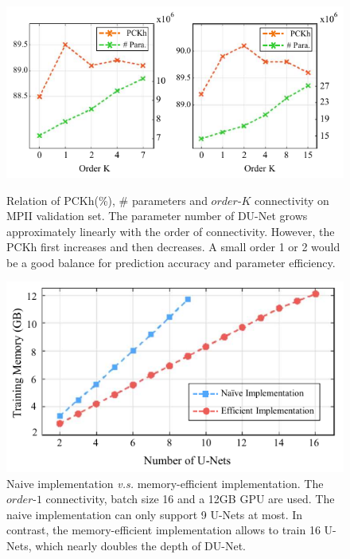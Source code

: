 \begin{figure}[t]
\centering
  \includegraphics[width=1\linewidth]{figures/exp-order-k-cropped.pdf}
  \caption{Relation of PCKh(\%), \# parameters and $order$-$K$ connectivity on MPII validation set. The parameter number of DU-Net grows approximately linearly with the order of connectivity. However, the PCKh first increases and then decreases. A small order 1 or 2 would be a good balance for prediction accuracy and parameter efficiency.}
\label{fig:exp-order-k}
\endminipage \hfill
{}
\centering
  \includegraphics[width=0.9\linewidth]{figures/exp-naive-vs-efficient-cropped.pdf}
  \caption{Naive implementation {\it v.s.} memory-efficient implementation. The $order$-$1$ connectivity, batch size 16 and a 12GB GPU are used. The naive implementation can only support 9 U-Nets at most. In contrast, the memory-efficient implementation allows to train 16 U-Nets, which nearly doubles the depth of DU-Net.}
  \label{fig:exp-naive-vs-efficient} \hfill
\endminipage
\end{figure}


